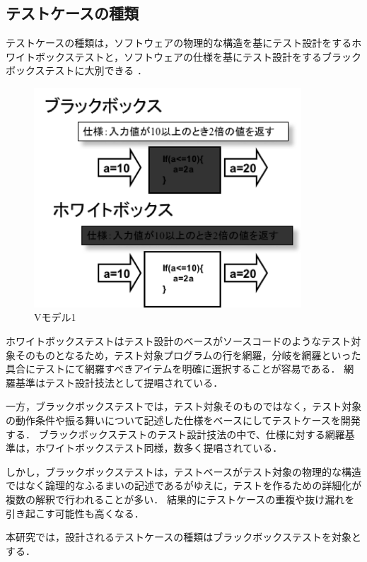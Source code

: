 \subsection{テストケースの種類}
テストケースの種類は，ソフトウェアの物理的な構造を基にテスト設計をするホワイトボックステストと，ソフトウェアの仕様を基にテスト設計をするブラックボックステストに大別できる\cite{myers2011art} ．

\begin{figure}[htbp]
  \begin{center}
  \includegraphics[width=10cm]{./image/BlackboxWhitebox.png}
  \caption{Vモデル1}
  \label{fig:D-2-Fig0}
  \end{center}
\end{figure}



ホワイトボックステストはテスト設計のベースがソースコードのようなテスト対象そのものとなるため，テスト対象プログラムの行を網羅，分岐を網羅といった具合にテストにて網羅すべきアイテムを明確に選択することが容易である．
網羅基準はテスト設計技法として提唱されている\cite{myers2011art,beiz90}．

一方，ブラックボックステストでは，テスト対象そのものではなく，テスト対象の動作条件や振る舞いについて記述した仕様をベースにしてテストケースを開発する．
ブラックボックステストのテスト設計技法の中で、仕様に対する網羅基準は，ホワイトボックステスト同様，数多く提唱されている\cite{myers2011art,beiz90}．

しかし，ブラックボックステストは，テストベースがテスト対象の物理的な構造ではなく論理的なふるまいの記述であるがゆえに，テストを作るための詳細化が複数の解釈で行われることが多い．
結果的にテストケースの重複や抜け漏れを引き起こす可能性も高くなる．

本研究では，設計されるテストケースの種類はブラックボックステストを対象とする．

